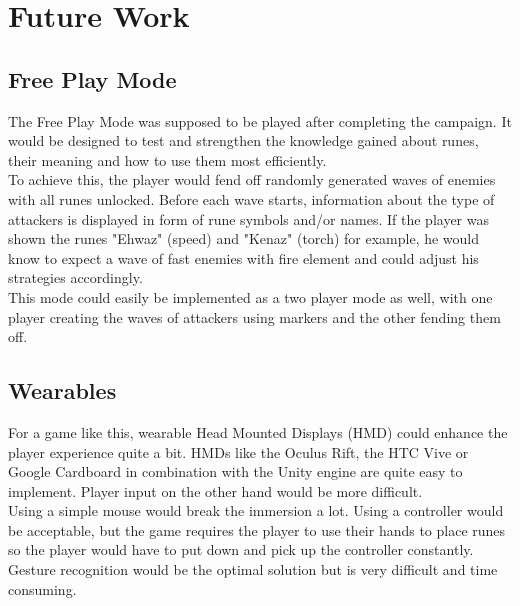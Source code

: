 \chapter{Future Work}

\section{Free Play Mode}

The Free Play Mode was supposed to be played after completing the campaign. It would be designed to test and strengthen the knowledge gained about runes, their meaning and how to use them most efficiently.\\
To achieve this, the player would fend off randomly generated waves of enemies with all runes unlocked. Before each wave starts, information about the type of attackers is displayed in form of rune symbols and/or names. If the player was shown the runes "Ehwaz" (speed) and "Kenaz" (torch) for example, he would know to expect a wave of fast enemies with fire element and could adjust his strategies accordingly.\\
This mode could easily be implemented as a two player mode as well, with one player creating the waves of attackers using markers and the other fending them off.

\section{Wearables}

For a game like this, wearable Head Mounted Displays (HMD) could enhance the player experience quite a bit. HMDs like the Oculus Rift, the HTC Vive or Google Cardboard in combination with the Unity engine are quite easy to implement. Player input on the other hand would be more difficult. \\ 
Using a simple mouse would break the immersion a lot. Using a controller would be acceptable, but the game requires the player to use their hands to place runes so the player would have to put down and pick up the controller constantly. Gesture recognition would be the optimal solution but is very difficult and time consuming. 
